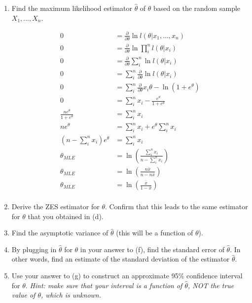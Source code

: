 \documentclass{article}
\newcommand{\1}{\mathbf{1}}
\begin{document}
\begin{enumerate}
    \newpage
    \item Find the maximum likelihood estimator $\hat{\theta}$ of $\theta$ based on the random sample $X_1,\ldots , X_n$.
    
    \begin{align*}
       0 &= \frac{\partial }{\partial\theta} \ln l(\theta | x_1,\hdots,x_n) \\
       0 &= \frac{\partial }{\partial\theta} \ln \prod_i^n l(\theta | x_i) \\
       0 &= \frac{\partial }{\partial\theta} \sum_i^n \ln l(\theta | x_i) \\
       0 &= \sum_i^n \frac{\partial }{\partial\theta}  \ln l(\theta | x_i) \\
       0 &= \sum_i^n \frac{\partial }{\partial\theta}  x_i\theta - \ln{(1+e^\theta)} \\
       0 &= \sum_i^n x_i - \frac{e^\theta}{1+e^\theta} \\
       \frac{ne^\theta}{1+e^\theta} &= \sum_i^n x_i \\
       ne^\theta &= \sum_i^n x_i + e^\theta\sum_i^n x_i \\
       \left(n - \sum_i^n x_i\right) e^\theta &= \sum_i^n x_i \\
       \theta_{MLE} &= \ln{\left( \frac{\sum_i^n x_i}{n - \sum_i^n x_i} \right)  } \\
       \theta_{MLE} &= \ln{\left( \frac{n\bar x}{n - n\bar x} \right)  } \\
       \theta_{MLE} &= \ln{\left( \frac{\bar x}{1 - \bar x} \right)  } \\
    \end{align*}
    
    \item Derive the ZES estimator for $\theta$. Confirm that this leads to the same estimator for $\theta$ that you obtained in (d).
    \item Find the asymptotic variance of $\hat{\theta}$ (this will be a function of $\theta$).
    \item By plugging in $\hat{\theta}$ for $\theta$ in your answer to (f), find the standard error of $\hat{\theta}$. In other words, find an estimate of the standard deviation of the estimator $\hat{\theta}$.
    \item Use your answer to (g) to construct an approximate 95\% confidence interval for $\theta$. {\it Hint: make sure that your interval is a function of $\hat{\theta}$, NOT the true value of $\theta$, which is unknown.}
\end{enumerate}
\end{document}
